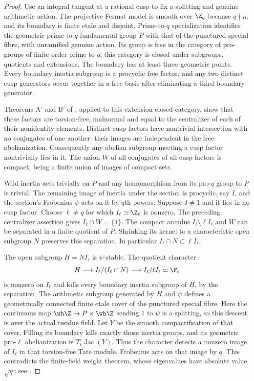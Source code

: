 \begin{proof}
Use an integral tangent at a rational cusp to fix a splitting and genuine arithmetic action. The projective Fermat model is smooth over $\Z_q$ because $q\nmid n$, and its boundary is finite etale and disjoint. Prime-to-$q$ specialization identifies the geometric prime-to-$q$ fundamental group $P$ with that of the punctured special fibre, with unramified genuine action. Its group is free in the category of pro-groups of finite order prime to $q$; this category is closed under subgroups, quotients and extensions. The boundary has at least three geometric points. Every boundary inertia subgroup is a procyclic free factor, and any two distinct cusp generators occur together in a free basis after eliminating a third boundary generator.

Theorems A' and B' of \citet{cHerfortRibes1985}, applied to this extension-closed category, show that these factors are torsion-free, malnormal and equal to the centralizer of each of their nonidentity elements. Distinct cusp factors have nontrivial intersection with no conjugates of one another: their images are independent in the free abelianization. Consequently any abelian subgroup meeting a cusp factor nontrivially lies in it. The union $W$ of all conjugates of all cusp factors is compact, being a finite union of images of compact sets.

Wild inertia acts trivially on $P$ and any homomorphism from its pro-$q$ group to $P$ is trivial. The remaining image of inertia under the section is procyclic, say $I$, and the section's Frobenius $\psi$ acts on it by $q$th powers. Suppose $I\ne1$ and it lies in no cusp factor. Choose $\ell\ne q$ for which $I_\ell\simeq\Z_\ell$ is nonzero. The preceding centralizer assertion gives $I_\ell\cap W=\{1\}$. The compact annulus $I_\ell\setminus\ell I_\ell$ and $W$ can be separated in a finite quotient of $P$. Shrinking its kernel to a characteristic open subgroup $N$ preserves this separation. In particular $I_\ell\cap N\subset\ell I_\ell$.

The open subgroup $H=NI_\ell$ is $\psi$-stable. The quotient character
\[
H\longrightarrow I_\ell/(I_\ell\cap N)
\longrightarrow I_\ell/\ell I_\ell\simeq\F_\ell
\]
is nonzero on $I_\ell$ and kills every boundary inertia subgroup of $H$, by the separation. The arithmetic subgroup generated by $H$ and $\psi$ defines a geometrically connected finite etale cover of the punctured special fibre. Here the continuous map $\wh\Z\to P\rtimes\wh\Z$ sending $1$ to $\psi$ is a splitting, so this descent is over the actual residue field. Let $Y$ be the smooth compactification of that cover. Filling its boundary kills exactly those inertia groups, and its geometric pro-$\ell$ abelianization is $T_\ell\operatorname{Jac}(Y)$. Thus the character detects a nonzero image of $I_\ell$ in that torsion-free Tate module. Frobenius acts on that image by $q$. This contradicts the finite-field weight theorem, whose eigenvalues have absolute value $\sqrt q$; see \citet[II, Theorem 1.1(b); III, Proposition 9.1]{Milne2008}.


\end{proof}
